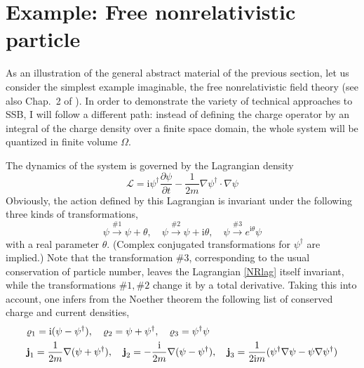 \documentclass[final,3p,times,12pt,a4paper,sort&compress]{elsarticle}
\newcommand\Lag{\mathscr{L}}                %
\newcommand\vek[1]{{\boldsymbol{\bf #1}}}   %
\newcommand\he[1]{#1^{\dagger}}             %
\newcommand\imag{\mathrm i}                 %
\newcommand\vr{\varrho}
\newcommand\vt{\theta}
\newcommand\PD[2]{\frac{\partial #1}{\partial #2}} %
\begin{document}

\section{Example: Free nonrelativistic particle}
\label{sec:freeNR} As an illustration of the general abstract material of the
previous section, let us consider the simplest example imaginable, the free
nonrelativistic field theory (see also Chap.~2 of \cite{Miransky:1993mi}). In
order to demonstrate the variety of technical approaches to SSB, I will follow a
different path: instead of defining the charge operator by an integral of the
charge density over a finite space domain, the whole system will be quantized
in finite volume $\Omega$.

The dynamics of the system is governed by the Lagrangian density
\begin{equation}
\Lag=\imag\he\psi\PD\psi t-\frac1{2m}\nabla\he\psi\cdot\nabla\psi
\label{NRlag}
\end{equation}
Obviously, the action defined by this Lagrangian is invariant under the
following three kinds of transformations,
\begin{equation}
\psi\xrightarrow{\#1}\psi+\vt,\quad
\psi\xrightarrow{\#2}\psi+\imag\vt,\quad
\psi\xrightarrow{\#3} e^{\imag\vt}\psi
\label{NRfreetransfo}
\end{equation}
with a real parameter $\vt$. (Complex conjugated transformations for $\he\psi$
are implied.) Note that the transformation $\#3$, corresponding to the usual
conservation of particle number, leaves the Lagrangian \eqref{NRlag} itself
invariant, while the transformations $\#1,\#2$ change it by a total derivative.
Taking this into account, one infers from the Noether theorem the following
list of conserved charge and current densities,
\begin{equation}
\begin{split}
&\vr_1=\imag(\psi-\he\psi),\quad
\vr_2=\psi+\he\psi,\quad
\vr_3=\he\psi\psi\\
&\vek j_1=\frac1{2m}\nabla(\psi+\he\psi),\quad
\vek j_2=-\frac{\imag}{2m}\nabla(\psi-\he\psi),\quad
\vek j_3=\frac{1}{2\imag m}(\he\psi\nabla\psi-\psi\nabla\he\psi)
\end{split}
\end{equation}
\end{document}
